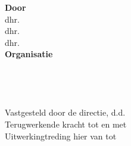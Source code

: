 \documentclass[10pt,a4paper,oneside]{article}
\begin{document}
\begin{titlepage}
    \begin{center}
    \vspace*{3cm}
    {\Huge\thetitle}
    
    \vspace*{0.4cm}
    \textnormal{\ondertitel}
    \end{center}
    
    \raggedleft
    \vfill
    \textbf{Door} \\
    dhr. \theauthor \\
    dhr. \begeleidertwee \\
    dhr. \begeleidereen \\

    \vspace{\vertspace}
    \textbf{Organisatie} \\
    \organisatie \\
    \mailorganisatie \\
    \telorganisatie \\
    \adres \\
    
    \vspace{\vertspace}
    Vastgesteld door de directie, d.d. \thedate \\
    Terugwerkende kracht tot en met \terugwerkend \\
    Uitwerkingtreding hier van tot \uittreden
\end{titlepage}
\end{document}

